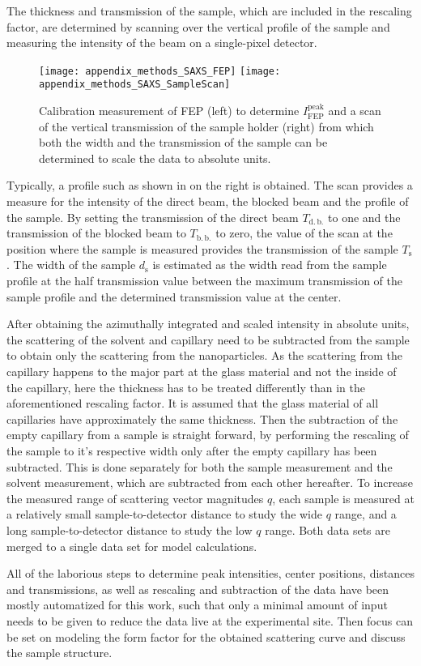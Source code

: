 \documentclass[\main/dresen_thesis.tex]{subfiles}
\begin{document}
    The thickness and transmission of the sample, which are included in the rescaling factor, are determined by scanning over the vertical profile of the sample and measuring the intensity of the beam on a single-pixel detector.
    \begin{figure}[tb]
      \centering
      \texttt{[image: appendix\_methods\_SAXS\_FEP]}
      \texttt{[image: appendix\_methods\_SAXS\_SampleScan]}
      \caption{\label{fig:methods:saxs:fep_scan}Calibration measurement of FEP (left) to determine $I_\mathrm{FEP}^\mathrm{peak}$ and a scan of the vertical transmission of the sample holder (right) from which both the width and the transmission of the sample can be determined to scale the data to absolute units.}
    \end{figure}
    Typically, a profile such as shown in  on the right is obtained.
    The scan provides a measure for the intensity of the direct beam, the blocked beam and the profile of the sample.
    By setting the transmission of the direct beam $T_\mathrm{d.\,b.}$ to one and the transmission of the blocked beam to $T_\mathrm{b.\,b.}$ to zero, the value of the scan at the position where the sample is measured provides the transmission of the sample $T_\mathrm{s}$.
    The width of the sample $d_\mathrm{s}$ is estimated as the width read from the sample profile at the half transmission value between the maximum transmission of the sample profile and the determined transmission value at the center.

    After obtaining the azimuthally integrated and scaled intensity in  absolute units, the scattering of the solvent and capillary need to be subtracted from the sample to obtain only the scattering from the nanoparticles.
    As the scattering from the capillary happens to the major part at the glass material and not the inside of the capillary, here the thickness has to be treated differently than in the aforementioned rescaling factor.
    It is assumed that the glass material of all capillaries have approximately the same thickness.
    Then the subtraction of the empty capillary from a sample is straight forward, by performing the rescaling of the sample to it's respective width only after the empty capillary has been subtracted.
    This is done separately for both the sample measurement and the solvent measurement, which are subtracted from each other hereafter.
    To increase the measured range of scattering vector magnitudes $q$, each sample is measured at a relatively small sample-to-detector distance to study the wide $q$ range, and a long sample-to-detector distance to study the low $q$ range.
    Both data sets are merged to a single data set for model calculations.

    All of the laborious steps to determine peak intensities, center positions, distances and transmissions, as well as rescaling and subtraction of the data have been mostly automatized for this work, such that only a minimal amount of input needs to be given to reduce the data live at the experimental site.
    Then focus can be set on modeling the form factor for the obtained scattering curve and discuss the sample structure.
\end{document}
